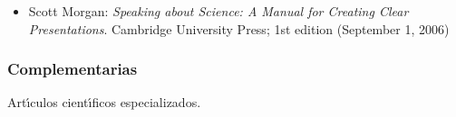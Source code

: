 \documentclass[10 pt]{article}
\begin{document}
 \begin{itemize}[itemsep=0em]

\item{Scott {\sc Morgan}: {\em Speaking about Science: A Manual for
      Creating Clear Presentations}.
    Cambridge University Press; 1st edition (September 1, 2006)}

\end{itemize}

\subsubsection{Complementarias}

Art\'{\i}culos cient\'{\i}ficos especializados.

\label{final} %


\end{document}
